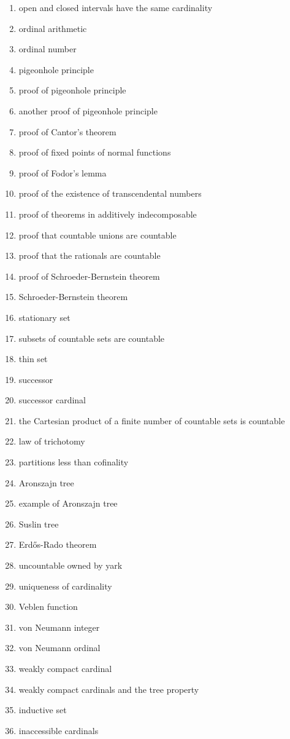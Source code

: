 \documentclass[12pt]{article}
\begin{document}
\begin{multicols}{2}
\begin{enumerate}
\item open and closed intervals have the same cardinality
\item ordinal arithmetic
\item ordinal number 
\item pigeonhole principle 
\item proof of pigeonhole principle
\item another proof of pigeonhole principle
\item proof of Cantor's theorem
\item proof of fixed points of normal functions
\item proof of Fodor's lemma
\item proof of the existence of transcendental numbers
\item proof of theorems in additively indecomposable
\item proof that countable unions are countable
\item proof that the rationals are countable
\item proof of Schroeder-Bernstein theorem
\item Schroeder-Bernstein theorem
\item stationary set
\item subsets of countable sets are countable
\item thin set
\item successor
\item successor cardinal
\item the Cartesian product of a finite number of countable sets is countable
\item law of trichotomy 
\item partitions less than cofinality
\item Aronszajn tree
\item example of Aronszajn tree
\item Suslin tree
\item Erd\H{o}s-Rado theorem
\item uncountable owned by yark
\item uniqueness of cardinality
\item Veblen function 
\item von Neumann integer
\item von Neumann ordinal
\item weakly compact cardinal
\item weakly compact cardinals and the tree property
\item inductive set
\item inaccessible cardinals
\end{enumerate}


\end{multicols}
\end{document}
